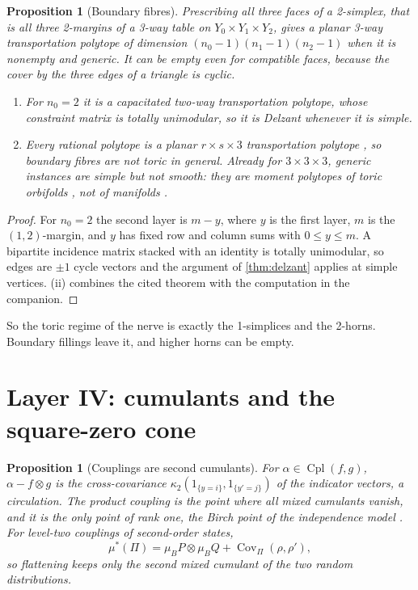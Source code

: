 \documentclass[11pt]{article}
\newtheorem{proposition}[theorem]{Proposition}
\theoremstyle{definition}
\theoremstyle{remark}
\newcommand{\Cpl}{\operatorname{Cpl}}
\begin{document}
\begin{proposition}[Boundary fibres]\label{prop:boundaryfibre}
Prescribing all three faces of a 2-simplex, that is all three 2-margins of a 3-way table on $Y_0\times Y_1\times Y_2$, gives
a planar 3-way transportation polytope of dimension $(n_0-1)(n_1-1)(n_2-1)$ when it is nonempty and generic. It can be empty
even for compatible faces, because the cover by the three edges of a triangle is cyclic.
\begin{enumerate}[label=(\roman*)]
\item For $n_0=2$ it is a capacitated two-way transportation polytope, whose constraint matrix is totally unimodular,
  so it is Delzant whenever it is simple.
\item Every rational polytope is a planar $r\times s\times3$ transportation polytope \cite{DeLoeraOnn2004}, so boundary fibres are
  not toric in general. Already for $3\times3\times3$, generic instances are simple but not smooth: they are moment polytopes
  of toric orbifolds \cite{LermanTolman1997}, not of manifolds \cite[\S10]{Awasthi-Family}.
\end{enumerate}
\end{proposition}
\begin{proof}
For $n_0=2$ the second layer is $m-y$, where $y$ is the first layer, $m$ is the $(1,2)$-margin, and $y$ has fixed row and column
sums with $0\le y\le m$. A bipartite incidence matrix stacked with an identity is totally unimodular, so edges are $\pm1$
cycle vectors and the argument of \cref{thm:delzant} applies at simple vertices. (ii) combines the cited theorem with
the computation in the companion.
\end{proof}

So the toric regime of the nerve is exactly the 1-simplices and the 2-horns. Boundary fillings leave it, and higher
horns can be empty.

\section{Layer IV: cumulants and the square-zero cone}\label{sec:linear}

\begin{proposition}[Couplings are second cumulants]\label{prop:kappa2}
For $\alpha\in\Cpl(f,g)$, $\alpha-f\otimes g$ is the cross-covariance $\kappa_2(1_{\{y=i\}},1_{\{y'=j\}})$ of the indicator vectors, a
circulation. The product coupling is the point where all mixed cumulants vanish, and it is the only point of
rank one, the Birch point of the independence model \cite{PachterSturmfels2005}. For level-two couplings of
second-order states,
\[
\mu^*(\Pi)=\mu_BP\otimes\mu_BQ+\operatorname{Cov}_\Pi(\rho,\rho'),
\]
so flattening keeps only the second mixed cumulant of the two random distributions.
\end{proposition}
\end{document}
